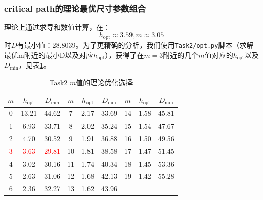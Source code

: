 \documentclass[UTF8,12pt,a4paper]{ctexart}
\begin{document}
\subsubsection{critical path的理论最优尺寸参数组合}

理论上通过求导和数值计算，在：
$$h_{\text{opt}} \approx 3.59, m \approx 3.05$$
时$D$有最小值：28.8039。为了更精确的分析，我们使用\texttt{Task2/opt.py}脚本（求解最优m附近的最小D以及对应$h_{\text{opt}}$），获得了在$m=3$附近的几个$m$值对应的$h_{\text{opt}}$以及$D_{\text{min}}$，见表\ref{tab:task2_m_opt}。
\begin{table}[htbp]
    \centering
    \caption{Task2 $m$值的理论优化选择}
    \label{tab:task2_m_opt}
    \begin{tabular}{ccc|ccc|ccc}
    \toprule
    $m$ & $h_{\text{opt}}$ & $D_{\text{min}}$ & 
    $m$ & $h_{\text{opt}}$ & $D_{\text{min}}$ & 
    $m$ & $h_{\text{opt}}$ & $D_{\text{min}}$ \\
    \midrule
    0 & 13.21 & 44.62 & 7 & 2.17 & 33.69 & 14 & 1.58 & 45.81 \\
    1 & 6.93 & 33.71 & 8 & 2.02 & 35.24 & 15 & 1.54 & 47.67 \\
    2 & 4.70 & 30.52 & 9 & 1.91 & 36.88 & 16 & 1.50 & 49.56 \\
    \textcolor{red}{3} & \textcolor{red}{3.63} & \textcolor{red}{29.81} & 10 & 1.81 & 38.58 & 17 & 1.47 & 51.45 \\
    4 & 3.02 & 30.16 & 11 & 1.74 & 40.34 & 18 & 1.45 & 53.36 \\
    5 & 2.63 & 31.06 & 12 & 1.68 & 42.13 & 19 & 1.42 & 55.28 \\
    6 & 2.36 & 32.27 & 13 & 1.62 & 43.96 & & & \\
    \bottomrule
    \end{tabular}
\end{table}
\end{document}
